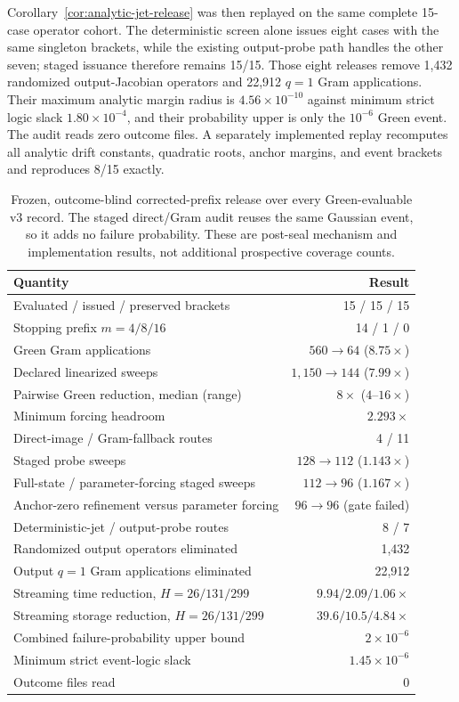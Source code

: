 \documentclass{article}
\begin{document}
Corollary~\ref{cor:analytic-jet-release} was then replayed on the same complete
15-case operator cohort.  The deterministic screen alone issues eight cases
with the same singleton brackets, while the existing output-probe path handles
the other seven; staged issuance therefore remains 15/15.  Those eight releases
remove 1,432 randomized output-Jacobian operators and 22,912 $q=1$ Gram
applications.  Their maximum analytic margin radius is
$4.56\times10^{-10}$ against minimum strict logic slack
$1.80\times10^{-4}$, and their probability upper is only the $10^{-6}$ Green
event.  The audit reads zero outcome files.  A separately implemented replay
recomputes all analytic drift constants, quadratic roots, anchor margins, and
event brackets and reproduces 8/15 exactly.

\begin{table}[H]
\caption{Frozen, outcome-blind corrected-prefix release over every
Green-evaluable v3 record.  The staged direct/Gram audit reuses the same
Gaussian event, so it adds no failure probability.  These are post-seal
mechanism and implementation results, not additional prospective coverage
counts.}
\label{tab:prefix-panel}
\centering
\small
\setlength{\tabcolsep}{8pt}
\begin{tabular}{lr}
\toprule
Quantity & Result \\
\midrule
Evaluated / issued / preserved brackets & 15 / 15 / 15 \\
Stopping prefix $m=4/8/16$ & 14 / 1 / 0 \\
Green Gram applications & $560\to64$ ($8.75\times$) \\
Declared linearized sweeps & $1{,}150\to144$ ($7.99\times$) \\
Pairwise Green reduction, median (range) & $8\times$ ($4$--$16\times$) \\
Minimum forcing headroom & $2.293\times$ \\
Direct-image / Gram-fallback routes & 4 / 11 \\
Staged probe sweeps & $128\to112$ ($1.143\times$) \\
Full-state / parameter-forcing staged sweeps & $112\to96$ ($1.167\times$) \\
Anchor-zero refinement versus parameter forcing & $96\to96$ (gate failed) \\
Deterministic-jet / output-probe routes & 8 / 7 \\
Randomized output operators eliminated & 1,432 \\
Output $q=1$ Gram applications eliminated & 22,912 \\
Streaming time reduction, $H=26/131/299$ & $9.94/2.09/1.06\times$ \\
Streaming storage reduction, $H=26/131/299$ & $39.6/10.5/4.84\times$ \\
Combined failure-probability upper bound & $2\times10^{-6}$ \\
Minimum strict event-logic slack & $1.45\times10^{-6}$ \\
Outcome files read & 0 \\
\bottomrule
\end{tabular}
\end{table}
\end{document}
